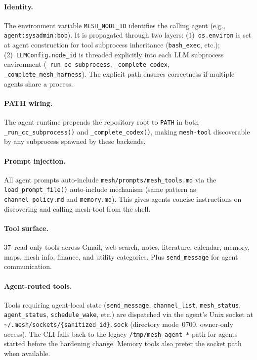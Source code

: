 \documentclass[11pt,a4paper]{article}
\newcommand{\code}[1]{\texttt{#1}}
\begin{document}
\paragraph{Identity.}
The environment variable \code{MESH\_NODE\_ID} identifies the calling
agent (e.g., \code{agent:sysadmin:bob}). It is propagated through two
layers: (1)~\code{os.environ} is set at agent construction for tool
subprocess inheritance (\code{bash\_exec}, etc.); (2)~\code{LLMConfig.node\_id}
is threaded explicitly into each LLM subprocess environment
(\code{\_run\_cc\_subprocess}, \code{\_complete\_codex},
\code{\_complete\_mesh\_harness}). The explicit path ensures correctness
if multiple agents share a process.

\paragraph{PATH wiring.}
The agent runtime prepends the repository root to \code{PATH} in both
\code{\_run\_cc\_subprocess()} and \code{\_complete\_codex()}, making
\code{mesh-tool} discoverable by any subprocess spawned by these
backends.

\paragraph{Prompt injection.}
All agent prompts auto-include \code{mesh/prompts/mesh\_tools.md} via
the \code{load\_prompt\_file()} auto-include mechanism (same pattern as
\code{channel\_policy.md} and \code{memory.md}). This gives agents
concise instructions on discovering and calling mesh-tool from the shell.

\paragraph{Tool surface.}
37~read-only tools across Gmail, web search, notes, literature,
calendar, memory, maps, mesh info, finance, and utility categories.
Plus \code{send\_message} for agent communication.

\paragraph{Agent-routed tools.}
Tools requiring agent-local state (\code{send\_message},
\code{channel\_list}, \code{mesh\_status}, \code{agent\_status},
\code{schedule\_wake}, etc.) are dispatched via the agent's Unix socket
at \code{\textasciitilde/.mesh/sockets/\{sanitized\_id\}.sock}
(directory mode~0700, owner-only access). The CLI falls back to the
legacy \code{/tmp/mesh\_agent\_*} path for agents started before the
hardening change. Memory tools also prefer the socket path when
available.
\end{document}
